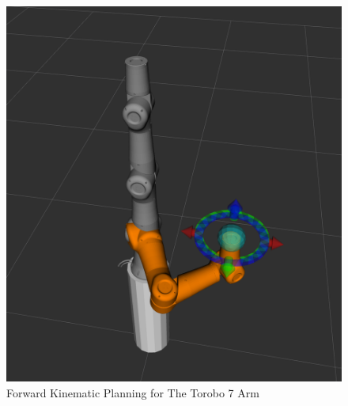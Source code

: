 \begin{figure}
	\centering
	\includegraphics[width=\columnwidth]{figures/torobo7.png}
	\caption{Forward Kinematic Planning for The Torobo 7 Arm}
	\label{fig:torobo7}
\end{figure}
%
